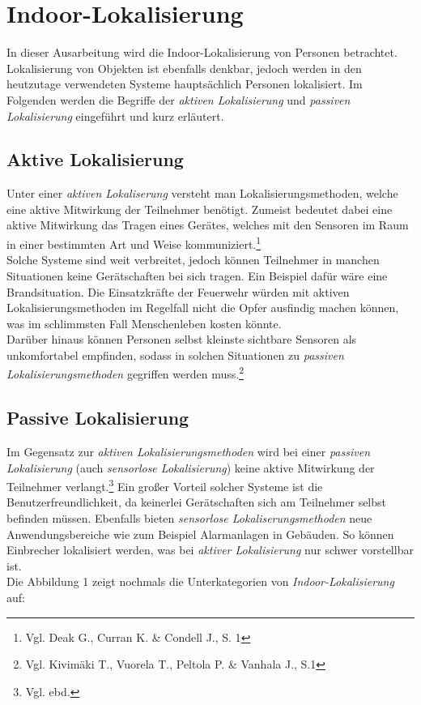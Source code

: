 \section{Indoor-Lokalisierung}

In dieser Ausarbeitung wird die Indoor-Lokalisierung von Personen betrachtet. Lokalisierung von Objekten ist ebenfalls denkbar, jedoch werden in den heutzutage verwendeten Systeme hauptsächlich Personen lokalisiert. Im Folgenden werden die Begriffe der \textit{aktiven Lokalisierung} und \textit{passiven Lokalisierung} eingeführt und kurz erläutert.

\subsection{Aktive Lokalisierung}
Unter einer \textit{aktiven Lokaliserung} versteht man Lokalisierungsmethoden, welche eine aktive Mitwirkung der Teilnehmer benötigt. Zumeist bedeutet dabei eine aktive Mitwirkung das Tragen eines Gerätes, welches mit den Sensoren im Raum in einer bestimmten Art und Weise kommuniziert.\footnote{Vgl. Deak G.,  Curran K. \& Condell J., S. 1}\\
Solche Systeme sind weit verbreitet, jedoch können Teilnehmer in manchen Situationen keine Gerätschaften bei sich tragen. Ein Beispiel dafür wäre eine Brandsituation. Die Einsatzkräfte der Feuerwehr würden mit aktiven Lokalisierungsmethoden im Regelfall nicht die Opfer ausfindig machen können, was im schlimmsten Fall Menschenleben kosten könnte.\\
Darüber hinaus können Personen selbst kleinste sichtbare Sensoren als unkomfortabel empfinden, sodass in solchen Situationen zu \textit{passiven Lokalisierungsmethoden} gegriffen werden muss.\footnote{Vgl. Kivimäki T., Vuorela T., Peltola P. \& Vanhala J., S.1}
\subsection{Passive Lokalisierung}
Im Gegensatz zur \textit{aktiven Lokalisierungsmethoden} wird bei einer \textit{passiven Lokalisierung} (auch \textit{sensorlose Lokalisierung}) keine aktive Mitwirkung der Teilnehmer verlangt.\footnote{Vgl. ebd.} Ein großer Vorteil solcher Systeme ist die Benutzerfreundlichkeit, da keinerlei Gerätschaften sich am Teilnehmer selbst befinden müssen. Ebenfalls bieten \textit{sensorlose Lokaliserungsmethoden} neue Anwendungsbereiche wie zum Beispiel Alarmanlagen in Gebäuden. So können Einbrecher lokalisiert werden, was bei \textit{aktiver Lokalisierung} nur schwer vorstellbar ist.\\
Die Abbildung 1 zeigt nochmals die Unterkategorien von \textit{Indoor-Lokalisierung} auf:

